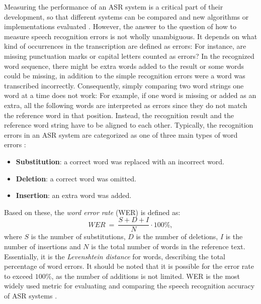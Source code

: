 \documentclass[english, 12pt, a4paper, pdftex, elec, utf8]{aaltothesis}
\begin{document}
Measuring the performance of an ASR system is a critical part of their development, so that different systems can be compared and new algorithms or implementations evaluated \cite{huang2001spoken}. However, the answer to the question of how to measure speech recognition errors is not wholly unambiguous. It depends on what kind of occurrences in the transcription are defined as errors: For instance, are missing punctuation marks or capital letters counted as errors? In the recognized word sequence, there might be extra words added to the result or some words could be missing, in addition to the simple recognition errors were a word was transcribed incorrectly. Consequently, simply comparing two word strings one word at a time does not work: For example, if one word is missing or added as an extra, all the following words are interpreted as errors since they do not match the reference word in that position. Instead, the recognition result and the reference word string have to be aligned to each other. Typically, the recognition errors in an ASR system are categorized as one of three main types of word errors \cite[p.~420]{huang2001spoken}:
\vspace{2mm}
\begin{itemize}[itemsep=2mm]
	\item \textbf{Substitution}: a correct word was replaced with an incorrect word.
	\item \textbf{Deletion}: a correct word was omitted.
	\item \textbf{Insertion}: an extra word was added.
\end{itemize}
\vspace{2mm}
Based on these, the \textit{word error rate} (WER) is defined as:
\begin{equation}
WER \ = \ \frac{S + D + I}{N} \cdot 100\%,
\end{equation}
where $S$ is the number of substitutions, $D$ is the number of deletions, $I$ is the number of insertions and $N$ is the total number of words in the reference text. Essentially, it is the \textit{Levenshtein distance} for words, describing the total percentage of word errors. It should be noted that it is possible for the error rate to exceed $100\%$, as the number of additions is not limited. WER is the most widely used metric for evaluating and comparing the speech recognition accuracy of ASR systems \cite{huang2001spoken, kallasjoki2016}. \\\\
\end{document}
